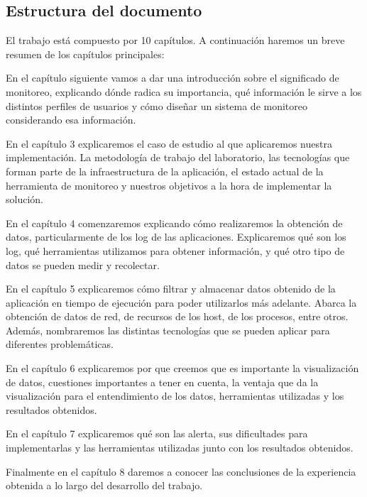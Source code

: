 \subsection{Estructura del documento}
\label{estructura}
El trabajo está compuesto por 10 capítulos. A continuación haremos un breve
resumen de los capítulos principales:

En el capítulo siguiente vamos a dar una introducción sobre el significado de
monitoreo, explicando dónde radica su importancia, qué información le sirve a
los distintos perfiles de usuarios y cómo diseñar un sistema de monitoreo
considerando esa información.

En el capítulo 3 explicaremos el caso de estudio al que aplicaremos nuestra
implementación. La metodología de trabajo del laboratorio, las tecnologías que
forman parte de la infraestructura de la aplicación, el estado actual de la
herramienta de monitoreo y nuestros objetivos a la hora de implementar la
solución.

En el capítulo 4 comenzaremos explicando cómo realizaremos la obtención de
datos, particularmente de los log de las aplicaciones.  Explicaremos qué son
los log, qué herramientas utilizamos para obtener información, y qué otro tipo
de datos se pueden medir y recolectar.

En el capítulo 5 explicaremos cómo filtrar y almacenar datos obtenido de la
aplicación en tiempo de ejecución para poder utilizarlos más adelante. Abarca
la obtención de datos de red, de recursos de los host, de los procesos, entre
otros. Además, nombraremos las distintas tecnologías que se pueden aplicar para
diferentes problemáticas.

En el capítulo 6 explicaremos por que creemos que es importante la
visualización de datos, cuestiones importantes a tener en cuenta, la ventaja
que da la visualización para el entendimiento de los datos, herramientas
utilizadas y los resultados obtenidos.

En el capítulo 7 explicaremos qué son las alerta, sus dificultades para
implementarlas y las herramientas utilizadas junto con los resultados
obtenidos.

Finalmente en el capítulo 8 daremos a conocer las conclusiones de la
experiencia obtenida a lo largo del desarrollo del trabajo.

